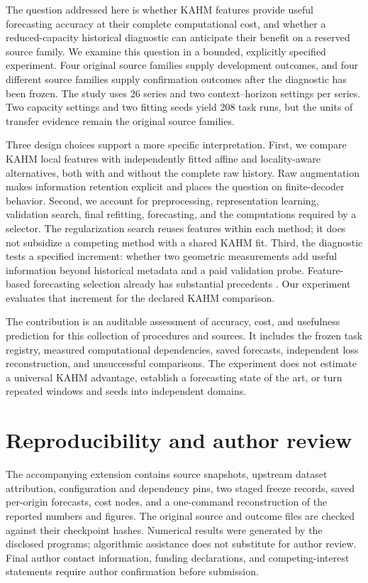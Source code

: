 \documentclass[twoside,11pt]{article}
\begin{document}
The question addressed here is whether KAHM features provide useful forecasting
accuracy at their complete computational cost, and whether a reduced-capacity
historical diagnostic can anticipate their benefit on a reserved source family.
We examine this question in a bounded, explicitly specified experiment. Four
original source families supply development outcomes, and four different source
families supply confirmation outcomes after the diagnostic has been frozen.
The study uses 26 series and two context--horizon settings per series. Two
capacity settings and two fitting seeds yield 208 task runs, but the units of
transfer evidence remain the original source families.

Three design choices support a more specific interpretation. First, we compare
KAHM local features with independently fitted affine and locality-aware
alternatives, both with and without the complete raw history. Raw augmentation
makes information retention explicit and places the question on finite-decoder
behavior. Second, we account for preprocessing, representation learning,
validation search, final refitting, forecasting, and the computations required
by a selector. The regularization search reuses features within each method;
it does not subsidize a competing method with a shared KAHM fit. Third, the
diagnostic tests a specified increment: whether two geometric measurements add
useful information beyond historical metadata and a paid validation probe.
Feature-based forecasting selection already has substantial precedents
\citep{Prudencio2004MetaLearning,MonteroManso2020FFORMA,Talagala2022FFORMPP,Talagala2023FFORMS}.
Our experiment evaluates that increment for the declared KAHM comparison.



The contribution is an auditable assessment of accuracy, cost, and usefulness
prediction for this collection of procedures and sources. It includes the
frozen task registry, measured computational dependencies, saved forecasts,
independent loss reconstruction, and unsuccessful comparisons. The experiment
does not estimate a universal KAHM advantage, establish a forecasting
state of the art, or turn repeated windows and seeds into independent domains.







\section*{Reproducibility and author review}
The accompanying extension contains source snapshots, upstream dataset
attribution, configuration and dependency pins, two staged freeze records,
saved per-origin forecasts, cost nodes, and a one-command reconstruction of
the reported numbers and figures. The original source and outcome files are
checked against their checkpoint hashes. Numerical results were generated by
the disclosed programs; algorithmic assistance does not substitute for author
review. Final author contact information, funding declarations, and
competing-interest statements require author confirmation before submission.


\appendix

\end{document}
